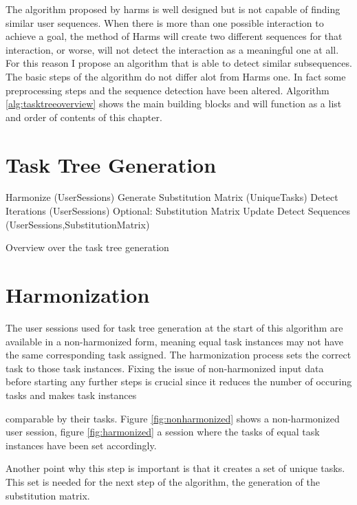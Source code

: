 The algorithm proposed by harms is well designed but is not capable of finding similar user sequences. 
When there is more than one possible interaction to achieve a goal, the method of Harms will create two different sequences for that interaction, 
or worse, will not detect the interaction as a meaningful one at all. For this reason I propose an algorithm that is able to detect similar subsequences.
The basic steps of the algorithm do not differ alot from Harms one. In fact some preprocessing steps and the sequence detection have been altered.
Algorithm \ref{alg:tasktreeoverview} shows the main building blocks and will function as a list and order of contents of this chapter.
\section{Task Tree Generation}

\begin{algorithm}[h]
\begin{algorithmic}
	\State Harmonize (UserSessions)
	\State Generate Substitution Matrix (UniqueTasks)
	\State Detect Iterations (UserSessions)
	\State Optional: Substitution Matrix Update
	\State Detect Sequences (UserSessions,SubstitutionMatrix)
	\EndWhile
	\EndProcedure
\end{algorithmic}
\caption{Overview over the task tree generation}
\label{alg:tasktreeoverview}
\end{algorithm}

\section{Harmonization}
The user sessions used for task tree generation at the start of this algorithm are available in a non-harmonized form, 
meaning equal task instances may not have the same corresponding task assigned. The harmonization process sets the correct task to those task instances.
Fixing the issue of non-harmonized input data before starting any further steps is crucial since it reduces the number of occuring tasks and makes task instances

comparable by their tasks. Figure \ref{fig:nonharmonized} shows a non-harmonized user session, figure \ref{fig:harmonized} a session where the tasks of equal task instances have been set accordingly.

Another point why this step is important is that it creates a set of unique tasks. This set is needed for the next step of the algorithm, the generation of the substitution matrix.

